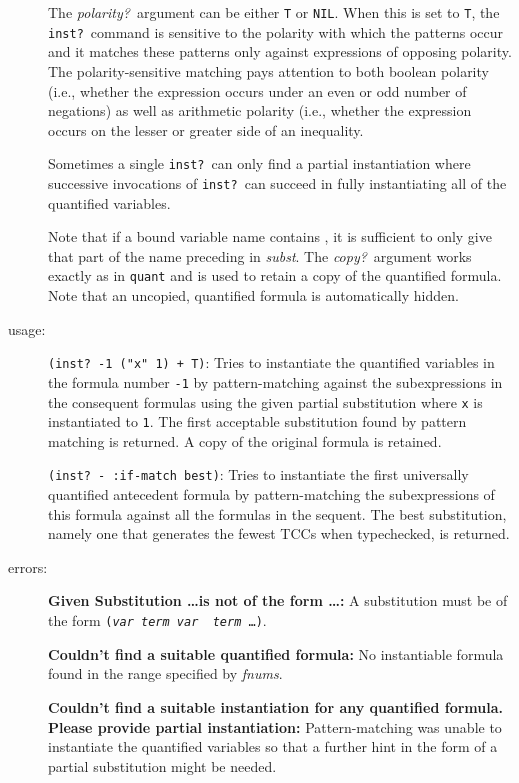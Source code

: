 \documentclass[12pt,twoside]{book}
\makeatletter
\newcommand{\indtt}[1]{\texttt{#1}\index{#1@{\texttt{#1}}}}  %
\makeatother
\begin{document}
\begin{description}
The \emph{polarity?}\ argument can be either \texttt{T} or \texttt{NIL}\@.
When this is set to \texttt{T}, the \texttt{inst?}\ command is sensitive to the
polarity with which the patterns occur and it matches these patterns only
against expressions of opposing polarity.  The polarity-sensitive matching
pays attention to both boolean polarity (i.e., whether the expression
occurs under an even or odd number of negations) 
as well as arithmetic polarity (i.e., whether the expression occurs
on the lesser or greater side of an inequality.  

Sometimes a single \indtt{inst?}\ can only find a partial
instantiation where successive invocations of \indtt{inst?}\ 
can succeed in fully instantiating all of the quantified variables.

Note that if a bound variable name contains \texttt{}, it is
sufficient to only give that part of the name preceding \texttt{} in {\em
subst}.  The \emph{copy?}\ argument works exactly as in \indtt{quant} and
is used to retain a copy of the quantified formula.  Note that an
uncopied, quantified formula is automatically hidden.

\item[usage: ] \texttt{(inst?\ -1 ("x" 1) + T)}: Tries to instantiate the
quantified variables in the formula number \texttt{-1} by pattern-matching
against the subexpressions in the consequent formulas using
the given partial substitution where \texttt{x} is instantiated to \texttt{1}.
The first acceptable substitution found by pattern matching is returned.
A copy of the original formula is retained.

\texttt{(inst?\ - :if-match best)}: Tries to instantiate the first universally
quantified antecedent formula by pattern-matching the subexpressions
of this formula against all the formulas in the sequent.  
The best substitution, namely one that generates the fewest TCCs when
typechecked, is returned.

\item[errors: ] {\bf Given Substitution \ldots is not of the form \ldots:}
A substitution 
must be of the form \texttt{(\emph{var} \emph{term} \emph{var} {\em
term} \ldots)}.

{\bf Couldn't find a suitable quantified formula:}  No instantiable
formula found in the range specified by \emph{fnums}.

{\bf Couldn't find a suitable instantiation for any
quantified  formula.  Please provide partial instantiation: }
Pattern-matching was unable to instantiate the quantified variables so
that a further  hint in the form of a partial substitution might be
needed.


\end{description}
\end{document}
